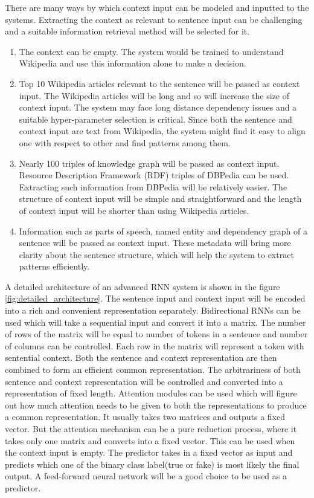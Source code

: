 \documentclass[a4paper, 11pt]{article}
\begin{document}
There are many ways by which context input can be modeled and inputted to the systems. \color{red}Extracting the context as relevant to sentence input can be challenging and a suitable information retrieval method will be selected for it.\color{black}

\begin{enumerate}
\item The context can be empty. The system would be trained to understand Wikipedia and use this information alone to make a decision.
\item Top 10 Wikipedia articles relevant to the sentence will be passed as context input. The Wikipedia articles will be long and so will increase the size of context input. The system may face long distance dependency issues and a suitable hyper-parameter selection is critical. Since both the sentence and context input are text from Wikipedia, the system might find it easy to align one with respect to other and find patterns among them. 
\item Nearly 100 triples of knowledge graph will be passed as context input. Resource Description Framework (RDF) triples of DBPedia can be used. Extracting such information from DBPedia will be relatively easier. The structure of context input will be simple and straightforward and the length of context input will be shorter than using Wikipedia articles.  
\item Information such as parts of speech, named entity and dependency graph of a sentence will be passed as context input. These metadata will bring more clarity about the sentence structure, which will help the system to extract patterns efficiently. 
\end{enumerate}

A detailed architecture of an advanced RNN system is shown in the figure \ref{fig:detailed_architecture}. The sentence input and context input will be encoded into a rich and convenient representation separately. Bidirectional RNNs can be used which will take a sequential input and convert it into a matrix. The number of rows of the matrix will be equal to number of tokens in a sentence and number of columns can be controlled. Each row in the matrix will represent a token with sentential context. Both the sentence and context representation are then combined to form an efficient common representation. The arbitrariness of both sentence and context representation will be controlled and converted into a representation of fixed length. Attention modules can be used which will figure out how much attention needs to be given to both the representations to produce a common representation. It usually takes two matrices and outputs a fixed vector. But the attention mechanism can be a pure reduction process, where it takes only one matrix and converts into a fixed vector. This can be used when the context input is empty. The predictor takes in a fixed vector as input and predicts which one of the binary class label(true or fake) is most likely the final output. A feed-forward neural network will be a good choice to be used as a predictor. 
\end{document}
